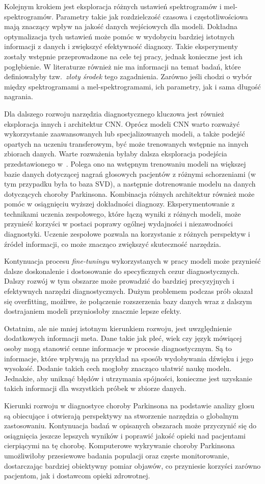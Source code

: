 Kolejnym krokiem jest eksploracja różnych ustawień spektrogramów i mel-spektrogramów.
Parametry takie jak rozdzielczość czasowa i częstotliwościowa mają znaczący wpływ na jakość danych wejściowych dla modeli.
Dokładna optymalizacja tych ustawień może pomóc w wydobyciu bardziej istotnych informacji z danych i zwiększyć efektywność diagnozy.
Takie eksperymenty zostały wstępnie przeprowadzone na cele tej pracy, jednak konieczne jest ich pogłębienie.
W literaturze również nie ma informacji na temat badań, które definiowałyby tzw.~\emph{złoty środek} tego zagadnienia.
Zarówno jeśli chodzi o wybór między spektrogramami a mel-spektrogramami, ich parametry, jak i sama długość nagrania.

Dla dalszego rozwoju narzędzia diagnostycznego kluczowa jest również eksploracja innych i architektur CNN\@.
Oprócz modeli CNN warto rozważyć wykorzystanie zaawansowanych lub specjalizowanych modeli, a także podejść opartych na uczeniu transferowym, być może trenowanych wstępnie na innych zbiorach danych.
Warte rozważenia byłaby dalsza eksploracja podejścia przedstawionego w~\cite{Wodzinski}.
Polega ono na wstępnym trenowaniu modeli na większej bazie danych dotyczącej nagrań głosowych pacjentów z różnymi schorzeniami (w tym przypadku była to baza SVD), a następnie dotrenowanie modelu na danych dotyczących choroby Parkinsona.
Kombinacja różnych architektur również może pomóc w osiągnięciu wyższej dokładności diagnozy.
Eksperymentowanie z technikami uczenia zespołowego, które łączą wyniki z różnych modeli, może przynieść korzyści w postaci poprawy ogólnej wydajności i niezawodności diagnostyki.
Uczenie zespołowe pozwala na korzystanie z różnych perspektyw i źródeł informacji, co może znacząco zwiększyć skuteczność narzędzia.

Kontynuacja procesu \emph{fine-tuningu} wykorzystanych w pracy modeli może przynieść dalsze doskonalenie i dostosowanie do specyficznych cezur diagnostycznych.
Dalszy rozwój w tym obszarze może prowadzić do bardziej precyzyjnych i efektywnych narzędzi diagnostycznych.
Dużym problemem podczas prób okazał się overfitting, możliwe, że połączenie rozszerzenia bazy danych wraz z dalszym dostrajaniem modeli przyniosłoby znacznie lepsze efekty.

Ostatnim, ale nie mniej istotnym kierunkiem rozwoju, jest uwzględnienie dodatkowych informacji meta.
Dane takie jak płeć, wiek czy język mówiącej osoby mogą stanowić cenne informacje w procesie diagnostycznym.
Są to informacje, które wpływają na przykład na sposób wydobywania dźwięku i jego wysokość.
Dodanie takich cech mogłoby znacząco ułatwić naukę modelu.
Jednakże, aby uniknąć błędów i utrzymania spójności, konieczne jest uzyskanie takich informacji dla wszystkich próbek w zbiorze danych.

Kierunki rozwoju w diagnostyce choroby Parkinsona na podstawie analizy głosu są obiecujące i otwierają perspektywy na stworzenie narzędzia o globalnym zastosowaniu.
Kontynuacja badań w opisanych obszarach może przyczynić się do osiągnięcia jeszcze lepszych wyników i poprawić jakość opieki nad pacjentami cierpiącymi na tę chorobę.
Komputerowe wykrywanie choroby Parkinsona umożliwiłoby przesiewowe badania populacji oraz częste monitorowanie, dostarczając bardziej obiektywny pomiar objawów, co przyniesie korzyści zarówno pacjentom, jak i dostawcom opieki zdrowotnej.
